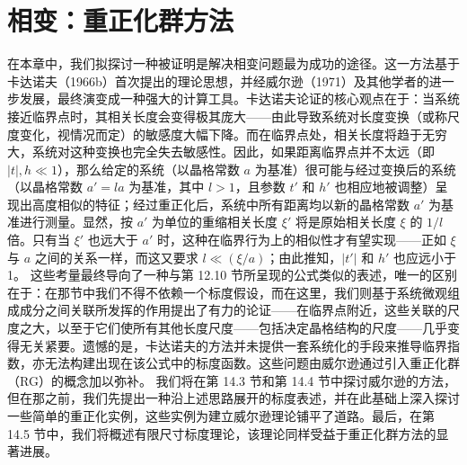 ﻿\chapter{相变：重正化群方法}\label{ux76f8ux53d8ux91cdux6b63ux5316ux7fa4ux65b9ux6cd5}
在本章中，我们拟探讨一种被证明是解决相变问题最为成功的途径。这一方法基于卡达诺夫（1966b）首次提出的理论思想，并经威尔逊（1971）及其他学者的进一步发展，最终演变成一种强大的计算工具。卡达诺夫论证的核心观点在于：当系统接近临界点时，其相关长度会变得极其庞大——由此导致系统对长度变换（或称尺度变化，视情况而定）的敏感度大幅下降。而在临界点处，相关长度将趋于无穷大，系统对这种变换也完全失去敏感性。因此，如果距离临界点并不太远（即 \(|t|, h \ll 1\)），那么给定的系统（以晶格常数 \(a\) 为基准）很可能与经过变换后的系统（以晶格常数 \(a' = la\) 为基准，其中 \(l > 1\)，且参数 \(t'\) 和 \(h'\) 也相应地被调整）呈现出高度相似的特征；经过重正化后，系统中所有距离均以新的晶格常数 \(a'\) 为基准进行测量。显然，按 \(a'\) 为单位的重缩相关长度 \(\xi'\) 将是原始相关长度 \(\xi\) 的 \(1/l\) 倍。只有当 \(\xi'\) 也远大于 \(a'\) 时，这种在临界行为上的相似性才有望实现——正如 \(\xi\) 与 \(a\) 之间的关系一样，而这又要求 \(l \ll (\xi/a)\)；由此推知，\(|t'|\) 和 \(h'\) 也应远小于 1。
这些考量最终导向了一种与第 12.10 节所呈现的公式类似的表述，唯一的区别在于：在那节中我们不得不依赖一个标度假设，而在这里，我们则基于系统微观组成成分之间关联所发挥的作用提出了有力的论证——在临界点附近，这些关联的尺度之大，以至于它们使所有其他长度尺度——包括决定晶格结构的尺度——几乎变得无关紧要。遗憾的是，卡达诺夫的方法并未提供一套系统化的手段来推导临界指数，亦无法构建出现在该公式中的标度函数。这些问题由威尔逊通过引入重正化群（RG）的概念加以弥补。
我们将在第 14.3 节和第 14.4 节中探讨威尔逊的方法，但在那之前，我们先提出一种沿上述思路展开的标度表述，并在此基础上深入探讨一些简单的重正化实例，这些实例为建立威尔逊理论铺平了道路。最后，在第 14.5 节中，我们将概述有限尺寸标度理论，该理论同样受益于重正化群方法的显著进展。
